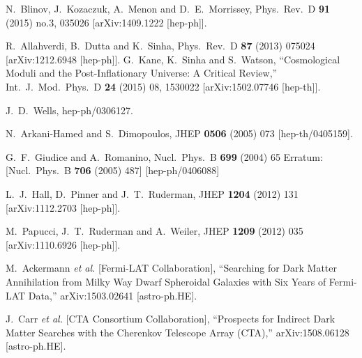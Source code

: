 \documentclass[11pt,a4paper]{article}
\begin{document}
\begin{thebibliography}{9}
  N.~Blinov, J.~Kozaczuk, A.~Menon and D.~E.~Morrissey,
  Phys.\ Rev.\ D {\bf 91} (2015) no.3,  035026
  [arXiv:1409.1222 [hep-ph]].
  
     R.~Allahverdi, B.~Dutta and K.~Sinha,
  Phys.\ Rev.\ D {\bf 87} (2013) 075024
  [arXiv:1212.6948 [hep-ph]]. 
  G.~Kane, K.~Sinha and S.~Watson,
  ``Cosmological Moduli and the Post-Inflationary Universe: A Critical Review,''
  Int.\ J.\ Mod.\ Phys.\ D {\bf 24} (2015) 08,  1530022
  [arXiv:1502.07746 [hep-th]].
  
  
  
  J.~D.~Wells,
  hep-ph/0306127.

  N.~Arkani-Hamed and S.~Dimopoulos,
  JHEP {\bf 0506} (2005) 073
  [hep-th/0405159].

  G.~F.~Giudice and A.~Romanino,
  Nucl.\ Phys.\ B {\bf 699} (2004) 65
   Erratum: [Nucl.\ Phys.\ B {\bf 706} (2005) 487]
  [hep-ph/0406088]
  
  L.~J.~Hall, D.~Pinner and J.~T.~Ruderman,
  JHEP {\bf 1204} (2012) 131
  [arXiv:1112.2703 [hep-ph]].
  
   M.~Papucci, J.~T.~Ruderman and A.~Weiler,
  JHEP {\bf 1209} (2012) 035
  [arXiv:1110.6926 [hep-ph]].
  
  
  

  M.~Ackermann {\it et al.} [Fermi-LAT Collaboration],
  ``Searching for Dark Matter Annihilation from Milky Way Dwarf Spheroidal Galaxies with Six Years of Fermi-LAT Data,''
  arXiv:1503.02641 [astro-ph.HE]. 
  
  
  J.~Carr {\it et al.} [CTA Consortium Collaboration],
  ``Prospects for Indirect Dark Matter Searches with the Cherenkov Telescope Array (CTA),''
  arXiv:1508.06128 [astro-ph.HE].
  

\end{thebibliography}
\end{document}
